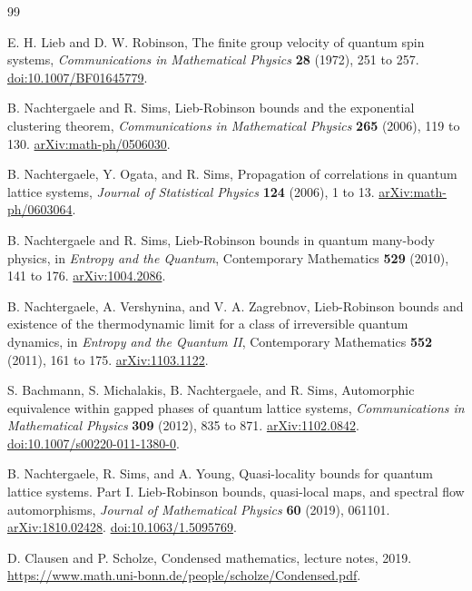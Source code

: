 \documentclass[12pt]{article}
\theoremstyle{definition}
\theoremstyle{remark}
\begin{document}
\begin{thebibliography}{99}

E. H. Lieb and D. W. Robinson,
The finite group velocity of quantum spin systems,
\emph{Communications in Mathematical Physics} \textbf{28} (1972), 251 to 257.
\href{https://doi.org/10.1007/BF01645779}{doi:10.1007/BF01645779}.

B. Nachtergaele and R. Sims,
Lieb-Robinson bounds and the exponential clustering theorem,
\emph{Communications in Mathematical Physics} \textbf{265} (2006), 119 to 130.
\href{https://arxiv.org/abs/math-ph/0506030}{arXiv:math-ph/0506030}.

B. Nachtergaele, Y. Ogata, and R. Sims,
Propagation of correlations in quantum lattice systems,
\emph{Journal of Statistical Physics} \textbf{124} (2006), 1 to 13.
\href{https://arxiv.org/abs/math-ph/0603064}{arXiv:math-ph/0603064}.

B. Nachtergaele and R. Sims,
Lieb-Robinson bounds in quantum many-body physics,
in \emph{Entropy and the Quantum}, Contemporary Mathematics \textbf{529}
(2010), 141 to 176.
\href{https://arxiv.org/abs/1004.2086}{arXiv:1004.2086}.

B. Nachtergaele, A. Vershynina, and V. A. Zagrebnov,
Lieb-Robinson bounds and existence of the thermodynamic limit for a class of
irreversible quantum dynamics,
in \emph{Entropy and the Quantum II}, Contemporary Mathematics \textbf{552}
(2011), 161 to 175.
\href{https://arxiv.org/abs/1103.1122}{arXiv:1103.1122}.

S. Bachmann, S. Michalakis, B. Nachtergaele, and R. Sims,
Automorphic equivalence within gapped phases of quantum lattice systems,
\emph{Communications in Mathematical Physics} \textbf{309} (2012), 835 to 871.
\href{https://arxiv.org/abs/1102.0842}{arXiv:1102.0842}.
\href{https://doi.org/10.1007/s00220-011-1380-0}{doi:10.1007/s00220-011-1380-0}.

B. Nachtergaele, R. Sims, and A. Young,
Quasi-locality bounds for quantum lattice systems. Part I.
Lieb-Robinson bounds, quasi-local maps, and spectral flow automorphisms,
\emph{Journal of Mathematical Physics} \textbf{60} (2019), 061101.
\href{https://arxiv.org/abs/1810.02428}{arXiv:1810.02428}.
\href{https://doi.org/10.1063/1.5095769}{doi:10.1063/1.5095769}.

D. Clausen and P. Scholze,
Condensed mathematics,
lecture notes, 2019.
\url{https://www.math.uni-bonn.de/people/scholze/Condensed.pdf}.

\end{thebibliography}
\end{document}
